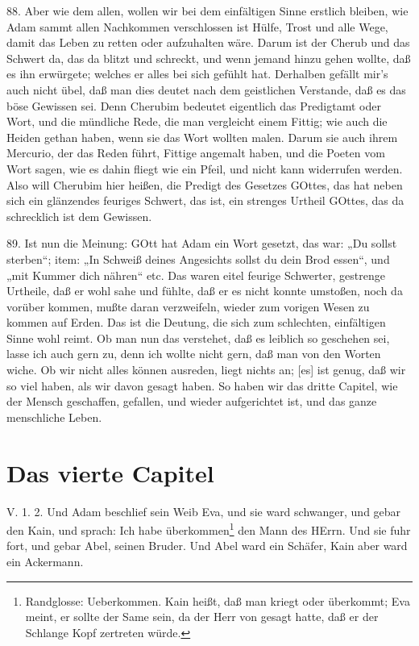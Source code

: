 88. Aber wie dem allen, wollen wir bei dem einfältigen Sinne erstlich bleiben, wie Adam sammt allen Nachkommen verschlossen ist Hülfe, Trost und alle Wege, damit das Leben zu retten oder aufzuhalten wäre. Darum ist der Cherub und das Schwert da, das da blitzt und schreckt, und wenn jemand hinzu gehen wollte, daß es ihn erwürgete; welches er alles bei sich gefühlt hat. Derhalben gefällt mir’s auch nicht übel, daß man dies deutet nach dem geistlichen Verstande, daß es das böse Gewissen sei. Denn Cherubim bedeutet eigentlich das Predigtamt oder Wort, und die mündliche Rede, die man vergleicht einem Fittig; wie auch die Heiden gethan haben, wenn sie das Wort wollten malen. Darum sie auch ihrem Mercurio, der das Reden führt, Fittige angemalt haben, und die Poeten vom Wort sagen, wie es dahin fliegt wie ein Pfeil, und nicht kann widerrufen werden. Also will Cherubim hier heißen, die Predigt des Gesetzes GOttes, das hat neben sich ein glänzendes feuriges Schwert, das ist, ein strenges Urtheil GOttes, das da schrecklich ist dem Gewissen.

89. Ist nun die Meinung: GOtt hat Adam ein Wort gesetzt, das war: „Du sollst sterben“; item: „In Schweiß deines Angesichts sollst du dein Brod essen“, und „mit Kummer dich nähren“ etc. Das waren eitel feurige Schwerter, gestrenge Urtheile, daß er wohl sahe und fühlte, daß er es nicht konnte umstoßen, noch da vorüber kommen, mußte daran verzweifeln, wieder zum vorigen Wesen zu kommen auf Erden. Das ist die Deutung, die sich zum schlechten, einfältigen Sinne wohl reimt. Ob man nun das verstehet, daß es leiblich so geschehen sei, lasse ich auch gern zu, denn ich wollte nicht gern, daß man von den Worten wiche. Ob wir nicht alles können ausreden, liegt nichts an; [es] ist genug, daß wir so viel haben, als wir davon gesagt haben. So haben wir das dritte Capitel, wie der Mensch geschaffen, gefallen, und wieder aufgerichtet ist, und das ganze menschliche Leben.

\section{Das vierte Capitel}

\begin{schriftzitat}
V. 1. 2. Und Adam beschlief sein Weib Eva, und sie ward schwanger, und gebar den Kain, und sprach: Ich habe überkommen\footnote{Randglosse: Ueberkommen. Kain heißt, daß man kriegt oder überkommt; Eva meint, er sollte der Same sein, da der Herr von gesagt hatte, daß er der Schlange Kopf zertreten würde.} den Mann des HErrn. Und sie fuhr fort, und gebar Abel, seinen Bruder. Und Abel ward ein Schäfer, Kain aber ward ein Ackermann.
\end{schriftzitat}

